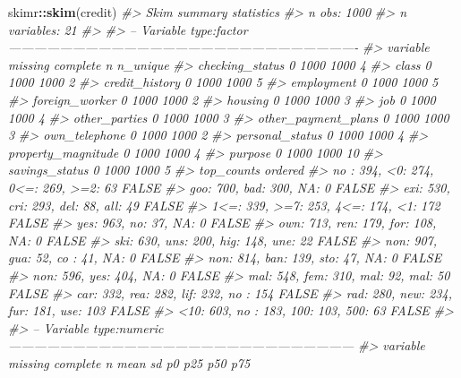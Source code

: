 \documentclass[]{article}
\newenvironment{Shaded}{\begin{snugshade}}{\end{snugshade}}
\newcommand{\CommentTok}[1]{\textcolor[rgb]{0.56,0.35,0.01}{\textit{#1}}}
\newcommand{\KeywordTok}[1]{\textcolor[rgb]{0.13,0.29,0.53}{\textbf{#1}}}
\newcommand{\NormalTok}[1]{#1}
\newcommand{\OperatorTok}[1]{\textcolor[rgb]{0.81,0.36,0.00}{\textbf{#1}}}
\begin{document}
\begin{Shaded}
\begin{Highlighting}[]
\NormalTok{skimr}\OperatorTok{::}\KeywordTok{skim}\NormalTok{(credit)}
\CommentTok{#> Skim summary statistics}
\CommentTok{#>  n obs: 1000 }
\CommentTok{#>  n variables: 21 }
\CommentTok{#> }
\CommentTok{#> -- Variable type:factor ----------------------------------------------------------------------------------}
\CommentTok{#>             variable missing complete    n n_unique}
\CommentTok{#>      checking_status       0     1000 1000        4}
\CommentTok{#>                class       0     1000 1000        2}
\CommentTok{#>       credit_history       0     1000 1000        5}
\CommentTok{#>           employment       0     1000 1000        5}
\CommentTok{#>       foreign_worker       0     1000 1000        2}
\CommentTok{#>              housing       0     1000 1000        3}
\CommentTok{#>                  job       0     1000 1000        4}
\CommentTok{#>        other_parties       0     1000 1000        3}
\CommentTok{#>  other_payment_plans       0     1000 1000        3}
\CommentTok{#>        own_telephone       0     1000 1000        2}
\CommentTok{#>      personal_status       0     1000 1000        4}
\CommentTok{#>   property_magnitude       0     1000 1000        4}
\CommentTok{#>              purpose       0     1000 1000       10}
\CommentTok{#>       savings_status       0     1000 1000        5}
\CommentTok{#>                              top_counts ordered}
\CommentTok{#>    no : 394, <0: 274, 0<=: 269, >=2: 63   FALSE}
\CommentTok{#>               goo: 700, bad: 300, NA: 0   FALSE}
\CommentTok{#>    exi: 530, cri: 293, del: 88, all: 49   FALSE}
\CommentTok{#>   1<=: 339, >=7: 253, 4<=: 174, <1: 172   FALSE}
\CommentTok{#>                 yes: 963, no: 37, NA: 0   FALSE}
\CommentTok{#>     own: 713, ren: 179, for: 108, NA: 0   FALSE}
\CommentTok{#>   ski: 630, uns: 200, hig: 148, une: 22   FALSE}
\CommentTok{#>       non: 907, gua: 52, co : 41, NA: 0   FALSE}
\CommentTok{#>      non: 814, ban: 139, sto: 47, NA: 0   FALSE}
\CommentTok{#>               non: 596, yes: 404, NA: 0   FALSE}
\CommentTok{#>    mal: 548, fem: 310, mal: 92, mal: 50   FALSE}
\CommentTok{#>  car: 332, rea: 282, lif: 232, no : 154   FALSE}
\CommentTok{#>  rad: 280, new: 234, fur: 181, use: 103   FALSE}
\CommentTok{#>   <10: 603, no : 183, 100: 103, 500: 63   FALSE}
\CommentTok{#> }
\CommentTok{#> -- Variable type:numeric ---------------------------------------------------------------------------------}
\CommentTok{#>                variable missing complete    n    mean      sd  p0    p25    p50     p75}

\end{Highlighting}
\end{Shaded}
\end{document}
